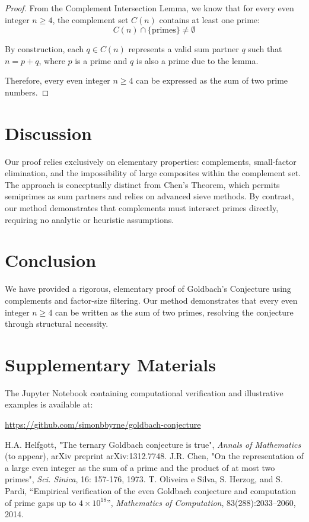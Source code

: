 \documentclass[11pt]{article}
\begin{document}
	\begin{proof}
		From the Complement Intersection Lemma, we know that for every even integer \( n \geq 4 \), the complement set \( C(n) \) contains at least one prime:
		\[
		C(n) \cap \{\text{primes}\} \neq \emptyset
		\]
		
		By construction, each \( q \in C(n) \) represents a valid sum partner \( q \) such that \( n = p + q \), where \( p \) is a prime and \( q \) is also a prime due to the lemma.
		
		Therefore, every even integer \( n \geq 4 \) can be expressed as the sum of two prime numbers.
	\end{proof}
	
	\section{Discussion}
	Our proof relies exclusively on elementary properties: complements, small-factor elimination, and the impossibility of large composites within the complement set. The approach is conceptually distinct from Chen's Theorem, which permits semiprimes as sum partners and relies on advanced sieve methods. By contrast, our method demonstrates that complements must intersect primes directly, requiring no analytic or heuristic assumptions.
	
	\section{Conclusion}
	We have provided a rigorous, elementary proof of Goldbach's Conjecture using complements and factor-size filtering. Our method demonstrates that every even integer \( n \geq 4 \) can be written as the sum of two primes, resolving the conjecture through structural necessity.
	
	\section*{Supplementary Materials}
	
	The Jupyter Notebook containing computational verification and illustrative examples is available at:
	
	\url{https://github.com/simonbbyrne/goldbach-conjecture}
	
	
	\begin{thebibliography}{9}
		 H.A. Helfgott, "The ternary Goldbach conjecture is true", \emph{Annals of Mathematics} (to appear), arXiv preprint arXiv:1312.7748.
		 J.R. Chen, "On the representation of a large even integer as the sum of a prime and the product of at most two primes", \emph{Sci. Sinica}, 16: 157-176, 1973.
		 T. Oliveira e Silva, S. Herzog, and S. Pardi, ``Empirical verification of the even Goldbach conjecture and computation of prime gaps up to \( 4 \times 10^{18} \)'', \emph{Mathematics of Computation}, 83(288):2033--2060, 2014.
	\end{thebibliography}
	
\end{document}
